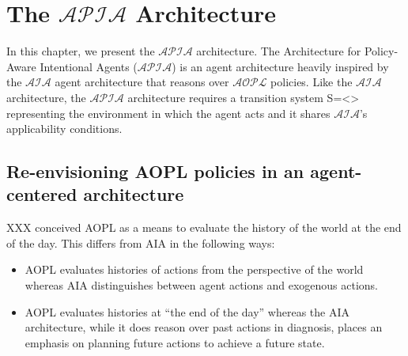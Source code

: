 \chapter{The $\mathcal{APIA}$ Architecture}

%
%
%
%
%
%

In this chapter, we present the $\mathcal{APIA}$ architecture.
The Architecture for Policy-Aware Intentional Agents ($\mathcal{APIA}$) is an agent architecture heavily inspired by the $\mathcal{AIA}$ agent architecture that reasons over $\mathcal{AOPL}$ policies.
Like the $\mathcal{AIA}$ architecture, the $\mathcal{APIA}$ architecture requires a transition system S=<> representing the environment in which the agent acts and it shares $\mathcal{AIA}$'s applicability conditions.

\section{Re-envisioning AOPL policies in an agent-centered architecture}

XXX conceived AOPL as a means to evaluate the history of the world at the end of the day.
This differs from AIA in the following ways:

\begin{itemize}
    \item AOPL evaluates histories of actions from the perspective of the world whereas AIA distinguishes between agent actions and exogenous actions.
    \item AOPL evaluates histories at ``the end of the day'' whereas the AIA architecture, while it does reason over past actions in diagnosis, places an emphasis on planning future actions to achieve a future state.
\end{itemize}

